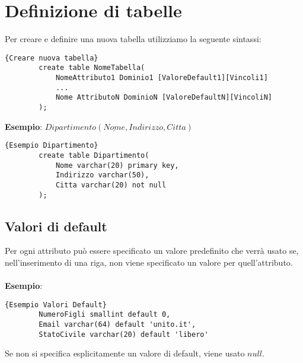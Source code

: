 \section{Definizione di tabelle}
Per creare e definire una nuova tabella utilizziamo la seguente sintassi:
    \begin{lstlisting}{Creare nuova tabella}
        create table NomeTabella(
            NomeAttributo1 Dominio1 [ValoreDefault1][Vincoli1]
            ...
            Nome AttributoN DominioN [ValoreDefaultN][VincoliN]
        );
    \end{lstlisting}
\textbf{Esempio}: $Dipartimento(\underline{Nome}, Indirizzo, Citta)$
    \begin{lstlisting}{Esempio Dipartimento}
        create table Dipartimento(
            Nome varchar(20) primary key,
            Indirizzo varchar(50),
            Citta varchar(20) not null
        );
    \end{lstlisting}
    
\subsection{Valori di default}
Per ogni attributo può essere specificato un valore predefinito che verrà usato se, nell'inserimento di una riga, non viene specificato un valore per quell'attributo.\\\\
\textbf{Esempio}: 
    \begin{lstlisting}{Esempio Valori Default}
        NumeroFigli smallint default 0,
        Email varchar(64) default 'unito.it',
        StatoCivile varchar(20) default 'libero'
    \end{lstlisting}
Se non si specifica esplicitamente un valore di default, viene usato $null$.

